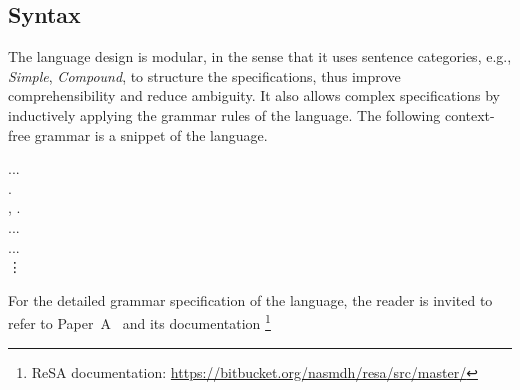 \subsection*{Syntax}
The language design is modular, in the sense that it uses sentence categories, e.g., \textit{Simple}, \textit{Compound}, to structure the specifications, thus improve comprehensibility and reduce ambiguity. It also allows complex specifications by inductively applying the grammar rules of the language. The following context-free grammar is a snippet of the \resa{} language. 
\begin{bnf*}
	{ \bnfor {}\bnfor{} ...}\\
	{ .} \\%
	{, .} \\%
	{\bnfor ...} \\%
	{  \bnfor...} \\%
	\vdots
\end{bnf*}
For the detailed grammar specification of the language, the reader is invited to refer to Paper~A~\cite{Mahmud2015ReSA:Systems} and its documentation
\footnote{ReSA documentation:  \url{https://bitbucket.org/nasmdh/resa/src/master/} }
